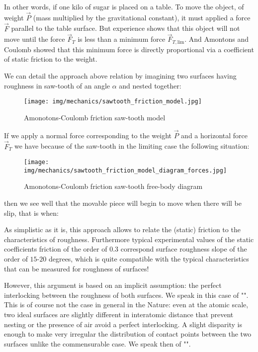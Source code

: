 \begin{enumerate}
		In other words, if one kilo of sugar is placed on a table. To move the object, of weight $\vec{P}$ (mass multiplied by the gravitational constant), it must applied a force $\vec{F}$ parallel to the table surface. But experience shows that this object will not move until the force $\vec{F}_T$ is less than a minimum force $\vec{F}_{T,\text{lim}}$. And Amontons and Coulomb showed that this minimum force is directly proportional via a coefficient of static friction to the weight.

		We can detail the approach above relation by imagining two surfaces having roughness in saw-tooth of an angle $\alpha$ and nested together:
		\begin{figure}[H]
			\centering
			\texttt{[image: img/mechanics/sawtooth\_friction\_model.jpg]}
			\caption{Amonotons-Coulomb friction saw-tooth model}
		\end{figure}
		If we apply a normal force corresponding to the weight $\vec{P}$ and a horizontal force $\vec{F}_T$ we have because of the saw-tooth in the limiting case the following situation:
		\begin{figure}[H]
			\centering
			\texttt{[image: img/mechanics/sawtooth\_friction\_model\_diagram\_forces.jpg]}
			\caption[]{Amonotons-Coulomb friction saw-tooth free-body diagram}
		\end{figure}
		then we see well that the movable piece will begin to move when there will be slip, that is when:
		
		As simplistic as it is, this approach allows to relate the (static) friction to the characteristics of roughness. Furthermore typical experimental values of the static coefficients friction of the order of $0.3$ correspond surface roughness slope of the order of $15$-$20$ degrees, which is quite compatible with the typical characteristics that can be measured for roughness of surfaces!
		
		However, this argument is based on an implicit assumption: the perfect interlocking between the roughness of both surfaces. We speak in this case of "". This is of course not the case in general in the Nature: even at the atomic scale, two ideal surfaces are slightly different in interatomic distance that prevent nesting or the presence of air avoid a perfect interlocking. A slight disparity is enough to make very irregular the distribution of contact points  between the two surfaces unlike the commensurable case. We speak then of "".
		

\end{enumerate}
